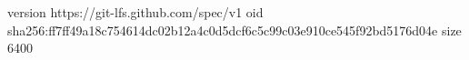 version https://git-lfs.github.com/spec/v1
oid sha256:ff7ff49a18c754614dc02b12a4c0d5dcf6c5c99c03e910ce545f92bd5176d04e
size 6400
